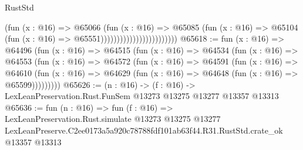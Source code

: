 \begin{lexlean}{RustStd}
\begin{coremodule}
                                            (fun (x : @16) =>
                                            @65066
                                              (fun (x : @16) =>
                                              @65085
                                                (fun (x : @16) =>
                                                @65104
                                                  (fun (x : @16) => @65551))))))))))))))))))))))))
@65618 := fun (x : @16) =>
  @64496
    (fun (x : @16) =>
    @64515
      (fun (x : @16) =>
      @64534
        (fun (x : @16) =>
        @64553
          (fun (x : @16) =>
          @64572
            (fun (x : @16) =>
            @64591
              (fun (x : @16) =>
              @64610
                (fun (x : @16) => @64629 (fun (x : @16) => @64648 (fun (x : @16) => @65599)))))))))
@65626 := (n : @16) ->
  (f : @16) -> LexLeanPreservation.Rust.FunSem @13273 @13275 @13277 @13357 @13313
@65636 := fun (n : @16) =>
  fun (f : @16) =>
  LexLeanPreservation.Rust.simulate
    @13273
    @13275
    @13277
    LexLeanPreserve.C2ee0173a5a920c78788fdf101ab63f44.R31.RustStd.crate_ok
    @13357
    @13313
\end{coremodule}
\end{lexlean}
